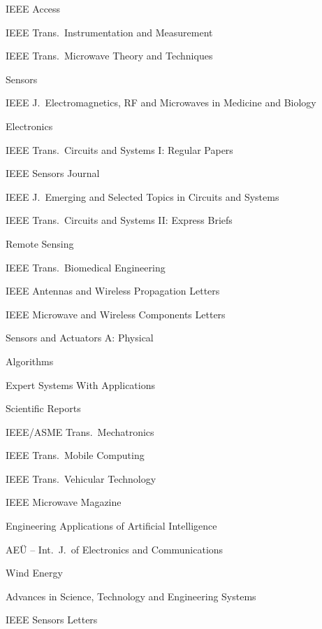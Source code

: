 \begin{cvlist}[2]
    \item IEEE Access~
    \item IEEE Trans.\ Instrumentation and Measurement~
    \item IEEE Trans.\ Microwave Theory and Techniques~
    \item Sensors~
    \item IEEE J.\ Electromagnetics, RF and Microwaves in Medicine and Biology~
    \item Electronics~
    \item IEEE Trans.\ Circuits and Systems I: Regular Papers~
    \item IEEE Sensors Journal~
    \item IEEE J.\ Emerging and Selected Topics in Circuits and Systems~
    \item IEEE Trans.\ Circuits and Systems II: Express Briefs~
    \item Remote Sensing~
    \item IEEE Trans.\ Biomedical Engineering~
    \item IEEE Antennas and Wireless Propagation Letters~
    \item IEEE Microwave and Wireless Components Letters~
    \item Sensors and Actuators A: Physical~
    \item Algorithms~
    \item Expert Systems With Applications~
    \item Scientific Reports~
    \item IEEE/ASME Trans.\ Mechatronics~
    \item IEEE Trans.\ Mobile Computing~
    \item IEEE Trans.\ Vehicular Technology~
    \item IEEE Microwave Magazine~
    \item Engineering Applications of Artificial Intelligence~
    \item AE\"{U} -- Int.\ J.\ of Electronics and Communications~
    \item Wind Energy~
    \item Advances in Science, Technology and Engineering Systems~
    \item IEEE Sensors Letters~

\end{cvlist}
